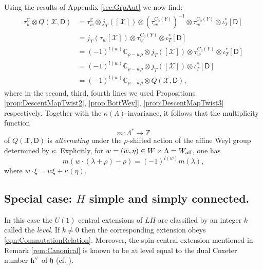 \documentclass[11pt,reqno]{amsart}
\theoremstyle{definition}
\theoremstyle{remark}
\newcommand{\ol}[1]{\overline{#1}}
\newcommand{\st}[1]{\mathsf{#1}}
\def\h{\ensuremath{\mathfrak{h}}}
\def\hvee{\ensuremath{\textnormal{h}^\vee}}
\def\X{\ensuremath{\mathcal{X}}}
\def\bC{\ensuremath{\mathbb{C}}}
\def\bZ{\ensuremath{\mathbb{Z}}}
\def\aff{\ensuremath{\textnormal{aff}}}
\begin{document}
Using the results of Appendix \ref{sec:GrpAut} we now find:
\begin{align*}
\tau_w^{\bC} \otimes Q(\X,\st{D}) &= \tau_w^{\bC}\otimes j_T([\X])\otimes (\tau_w^{C_0(Y)})^{-1}\otimes \tau_w^{C_0(Y)}\otimes \iota_T^\ast[\st{D}]\\
&=j_T(\tau_w[\X])\otimes \tau_w^{C_0(Y)}\otimes \iota_T^\ast[\st{D}]\\
&=(-1)^{l(w)}\bC_{\rho-w\rho}\otimes j_T([\X])\otimes \tau_w^{C_0(Y)}\otimes \iota_T^\ast[\st{D}]\\
&=(-1)^{l(w)}\bC_{\rho-w\rho}\otimes j_T([\X])\otimes \iota_T^\ast[\st{D}]\\
&=(-1)^{l(w)}\bC_{\rho-w\rho}\otimes Q(\X,\st{D}),
\end{align*}
where in the second, third, fourth lines we used Propositions \ref{prop:DescentMapTwist2}, \ref{prop:BottWeyl}, \ref{prop:DescentMapTwist3} respectively.  Together with the $\kappa(\Lambda)$-invariance, it follows that the multiplicity function 
\[ m \colon \Lambda^\ast \rightarrow \bZ \]
of $ Q(\X,\st{D})$ is \emph{alternating} under the $\rho$-shifted action of the affine Weyl group determined by $\kappa$.  Explicitly, for $w=(\ol{w},\eta) \in W \ltimes \Lambda=W_{\aff}$, one has
\begin{equation} 
\label{eqn:ShiftedAction}
m(w\cdot (\lambda+\rho)-\rho)=(-1)^{l(w)}m(\lambda),
\end{equation}
where $w\cdot \xi=\ol{w}\xi+\kappa(\eta)$.

\subsection{Special case: $H$ simple and simply connected.}
In this case the $U(1)$ central extensions of $LH$ are classified by an integer $k$ called the \emph{level}.  If $k \ne 0$ then the corresponding extension obeys \eqref{eqn:CommutationRelation}.  Moreover, the spin central extension mentioned in Remark \ref{rem:Canonical} is known to be at level equal to the dual Coxeter number $\hvee$ of $\h$ (cf. \cite{PressleySegal,LMSspinor}).
\end{document}
